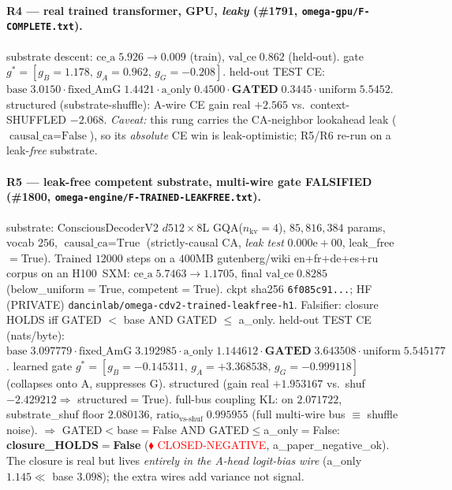 \documentclass[11pt]{article}
\begin{document}
\paragraph{R4 --- real trained transformer, GPU, \emph{leaky} (\#1791, \texttt{omega-gpu/F-COMPLETE.txt}).}
substrate descent: $\text{ce\_a}\;5.926\rightarrow0.009$ (train), $\text{val\_ce}\;0.862$
(held-out). gate $g^\ast=[g_B{=}1.178,\,g_A{=}0.962,\,g_G{=}-0.208]$. held-out TEST CE:
$\text{base}\;3.0150 \cdot \text{fixed\_AmG}\;1.4421 \cdot \text{a\_only}\;0.4500 \cdot
\textbf{GATED}\;0.3445 \cdot \text{uniform}\;5.5452$. structured (substrate-shuffle): A-wire CE
gain real $+2.565$ vs.\ context-SHUFFLED $-2.068$. \emph{Caveat:} this rung carries the
CA-neighbor lookahead leak ($\text{causal\_ca}{=}\text{False}$), so its \emph{absolute} CE
win is leak-optimistic; R5/R6 re-run on a leak-\emph{free} substrate.

\paragraph{R5 --- leak-free competent substrate, multi-wire gate FALSIFIED (\#1800,
\texttt{omega-engine/F-TRAINED-LEAKFREE.txt}).}
substrate: ConsciousDecoderV2 $d512\times8$L GQA($n_\text{kv}{=}4$), $85{,}816{,}384$ params,
vocab $256$, $\text{causal\_ca}{=}\text{True}$ (strictly-causal CA, \emph{leak test}
$0.000\mathrm{e}{+}00$, leak\_free$=$True). Trained $12000$ steps on a $400$MB gutenberg/wiki
en+fr+de+es+ru corpus on an H100~SXM: $\text{ce\_a}\;5.7463\rightarrow1.1705$, final
$\text{val\_ce}\;0.8285$ (below\_uniform$=$True, competent$=$True). ckpt sha256
\texttt{6f085c91...}; HF (PRIVATE) \texttt{dancinlab/omega-cdv2-trained-leakfree-h1}.
Falsifier: closure HOLDS iff GATED $<$ base AND GATED $\le$ a\_only. held-out TEST CE
(nats/byte): $\text{base}\;3.097779 \cdot \text{fixed\_AmG}\;3.192985 \cdot
\text{a\_only}\;1.144612 \cdot \textbf{GATED}\;3.643508 \cdot \text{uniform}\;5.545177$.
learned gate $g^\ast=[g_B{=}-0.145311,\,g_A{=}+3.368538,\,g_G{=}-0.999118]$ (collapses onto A,
suppresses G). structured (gain real $+1.953167$ vs.\ shuf $-2.429212 \Rightarrow$
structured$=$True). full-bus coupling KL: on $2.071722$, substrate\_shuf floor $2.080136$,
$\text{ratio}_\text{vs-shuf}\;0.995955$ (full multi-wire bus $\equiv$ shuffle noise).
$\Rightarrow$ GATED$<$base$=$False AND GATED$\le$a\_only$=$False: \textbf{closure\_HOLDS$=$False}
(\textcolor{red}{$\blacklozenge$ CLOSED-NEGATIVE}, a\_paper\_negative\_ok). The closure is real
but lives \emph{entirely in the A-head logit-bias wire} (a\_only $1.145\ll$ base $3.098$); the
extra wires add variance not signal.
\end{document}
